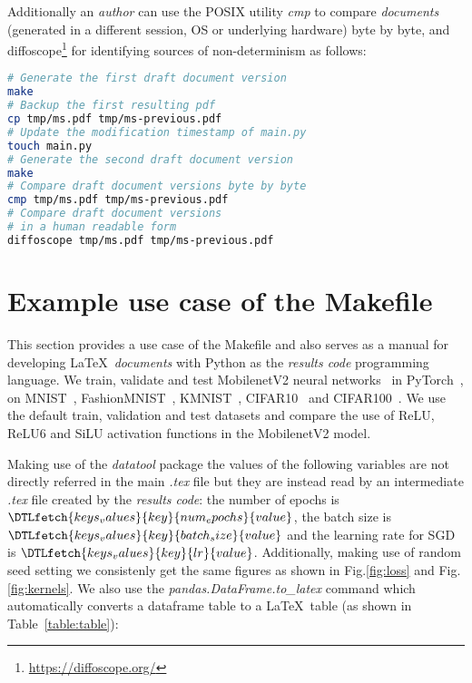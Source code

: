 \documentclass[journal]{IEEEtran}
\begin{document}
Additionally an \textit{author} can use the POSIX utility \textit{cmp} to compare \textit{documents} (generated in a different session, OS or underlying hardware) byte by byte, and diffoscope\footnote{\url{https://diffoscope.org/}} for identifying sources of non-determinism as follows:
\begin{lstlisting}[language=bash, style=lststyle, caption={Test draft document version reproducibility. This can also be used as a test script when pushing or pull requesting to a remote repository.}]
# Generate the first draft document version
make
# Backup the first resulting pdf
cp tmp/ms.pdf tmp/ms-previous.pdf
# Update the modification timestamp of main.py
touch main.py
# Generate the second draft document version
make
# Compare draft document versions byte by byte
cmp tmp/ms.pdf tmp/ms-previous.pdf
# Compare draft document versions
# in a human readable form
diffoscope tmp/ms.pdf tmp/ms-previous.pdf
\end{lstlisting}

\section{Example use case of the Makefile}
This section provides a use case of the Makefile and also serves as a manual for developing \LaTeX\ \textit{documents} with Python as the \textit{results code} programming language.
We train, validate and test MobilenetV2 neural networks~\cite{sandler2018mobilenetv2} in PyTorch~\cite{paszke2019pytorch}, on MNIST~\cite{lecun2010mnist}, FashionMNIST~\cite{xiao2017fashion}, KMNIST~\cite{clanuwat2018deep}, CIFAR10~\cite{krizhevsky2009learning} and CIFAR100~\cite{krizhevsky2009learning}.
We use the default train, validation and test datasets and compare the use of ReLU, ReLU6\cite{dahl2013improving} and SiLU\cite{elfwing2018sigmoid} activation functions in the MobilenetV2 model.

Making use of the \textit{datatool} package the values of the following variables are not directly referred in the main \textit{.tex} file but they are instead read by an intermediate \textit{.tex} file created by the \textit{results code}: the number of epochs is $\DTLfetch{keys_values}{key}{num_epochs}{value}$, the batch size is $\DTLfetch{keys_values}{key}{batch_size}{value}$ and the learning rate for SGD is $\DTLfetch{keys_values}{key}{lr}{value}$.
Additionally, making use of random seed setting we consistenly get the same figures as shown in Fig.\ref{fig:loss} and Fig.\ref{fig:kernels}.
We also use the \textit{pandas.DataFrame.to\_latex} command which automatically converts a dataframe table to a \LaTeX\ table (as shown in Table~\ref{table:table}):
\end{document}
